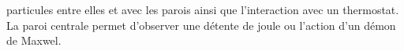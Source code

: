particules entre elles et avec les parois ainsi que l'interaction avec un thermostat.
%
La paroi centrale permet d'observer une détente de joule ou l'action d'un démon de Maxwel.
%
